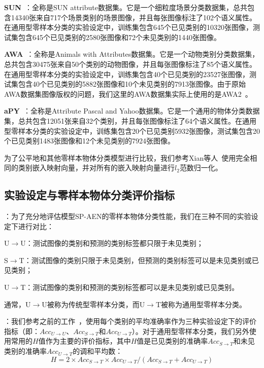 \textbf{SUN}~\cite{patterson2012sun}：全称是SUN attribute数据集。它是一个细粒度场景分类数据集，总共包含14340张来自717个场景类别的场景图像，并且每张图像标注了102个语义属性。在通用型零样本分类的实验设定中，训练集包含645个已见类别的10320张图像，测试集包含645个已见类别的2580张图像和72个未见类别的1440张图像。

\textbf{AWA}~\cite{lampert2009learning}：全称是Animals with Attributes数据集。它是一个动物类别分类数据集，总共包含30475张来自50个类别的动物图像，并且每张图像标注了85个语义属性。在通用型零样本分类的实验设定中，训练集包含40个已见类别的23527张图像，测试集包含40个已见类别的5882张图像和10个未见类别的7913张图像。由于原始AWA数据集图像版权的问题，我们这里的AWA数据集实际上使用的是AWA2~\cite{xian2017zero,xian2018zero}。

\textbf{aPY}~\cite{farhadi2009describing}：全称是Attribute Pascal and Yahoo数据集。它是一个通用的物体分类数据集，总共包含12051张来自32个类别，并且每张图像标注了64个语义属性。在通用型零样本分类的实验设定中，训练集包含20个已见类别5932张图像，测试集包含20个已见类别1483张图像和12个未见类别的7924张图像。

为了公平地和其他零样本物体分类模型进行比较，我们参考Xian等人~\cite{xian2017zero}使用完全相同的类别嵌入映射向量，并对所有的嵌入映射向量进行$l_2$范数归一化。


\subsection{实验设定与零样本物体分类评价指标}
\textbf{}：为了充分地评估模型SP-AEN的零样本物体分类性能，我们在三种不同的实验设定下进行对比：
\begin{asparaenum}
\item U$\to$U：测试图像的类别和预测的类别标签都只限于未见类别；

\item S$\to$T：测试图像的类别只限于未见类别，但预测的类别标签可以是未见类别或已见类别；

\item U$\to$T：测试图像的类别和预测的类别标签都可以是未见类别或已见类别。
\end{asparaenum}
通常，U$\to$U被称为传统型零样本分类，而U$\to$T被称为通用型零样本分类。

\textbf{}：我们参考之前的工作~\cite{xian2017zero}，使用每个类别的平均准确率作为三种实验设定下的评价指标（即：$Acc_{U\rightarrow U}$、$Acc_{S\rightarrow T}$和$Acc_{U\rightarrow T}$）。对于通用型零样本分类，我们另外使用常用的$H$值作为主要的评价指标，其中$H$值是已见类别的准确率$Acc_{S\rightarrow T}$和未见类别的准确率$Acc_{U\rightarrow T}$的调和平均数：
\begin{equation} \label{ch3:eq:eq_7}
H = 2\times Acc_{S\rightarrow T}\times Acc_{U\rightarrow T} /(Acc_{S\rightarrow T}+Acc_{U\rightarrow T})
\end{equation}

